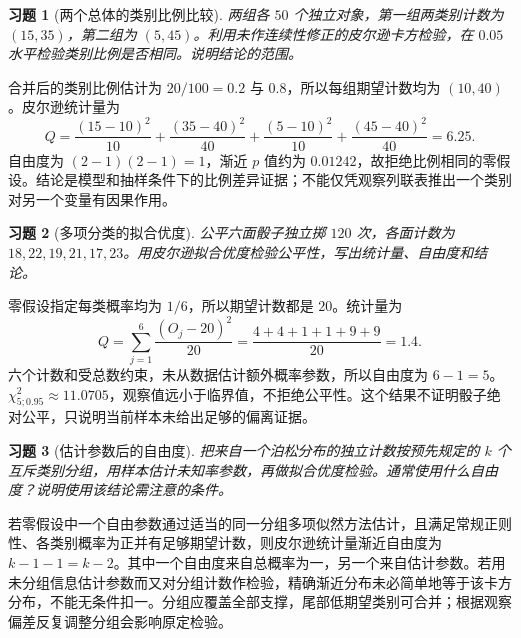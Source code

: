 \documentclass[12pt,fontset=fandol]{ctexart}
\newtheorem{exercise}{习题}[section]
\begin{document}
\begin{exercise}[两个总体的类别比例比较]\label{q:M-E2-II5}
两组各 $50$ 个独立对象，第一组两类别计数为 $(15,35)$，第二组为 $(5,45)$。利用未作连续性修正的皮尔逊卡方检验，在 $0.05$ 水平检验类别比例是否相同。说明结论的范围。\par{}
\end{exercise}

\begin{solve}\label{a:M-E2-II5}合并后的类别比例估计为 $20/100=0.2$ 与 $0.8$，所以每组期望计数均为 $(10,40)$。皮尔逊统计量为\[Q=\frac{(15-10)^2}{10}+\frac{(35-40)^2}{40}+\frac{(5-10)^2}{10}+\frac{(45-40)^2}{40}=6.25.\]自由度为 $(2-1)(2-1)=1$，渐近 $p$ 值约为 $0.01242$，故拒绝比例相同的零假设。结论是模型和抽样条件下的比例差异证据；不能仅凭观察列联表推出一个类别对另一个变量有因果作用。\end{solve}

\begin{exercise}[多项分类的拟合优度]\label{q:B15.1}
公平六面骰子独立掷 $120$ 次，各面计数为 $18,22,19,21,17,23$。用皮尔逊拟合优度检验公平性，写出统计量、自由度和结论。\par{}
\end{exercise}

\begin{solve}\label{a:B15.1}零假设指定每类概率均为 $1/6$，所以期望计数都是 $20$。统计量为\[Q=\sum_{j=1}^6\frac{(O_j-20)^2}{20}=\frac{4+4+1+1+9+9}{20}=1.4.\]六个计数和受总数约束，未从数据估计额外概率参数，所以自由度为 $6-1=5$。$\chi^2_{5;0.95}\approx11.0705$，观察值远小于临界值，不拒绝公平性。这个结果不证明骰子绝对公平，只说明当前样本未给出足够的偏离证据。\end{solve}

\begin{exercise}[估计参数后的自由度]\label{q:B15.2}
把来自一个泊松分布的独立计数按预先规定的 $k$ 个互斥类别分组，用样本估计未知率参数，再做拟合优度检验。通常使用什么自由度？说明使用该结论需注意的条件。\par{}
\end{exercise}

\begin{solve}\label{a:B15.2}若零假设中一个自由参数通过适当的同一分组多项似然方法估计，且满足常规正则性、各类别概率为正并有足够期望计数，则皮尔逊统计量渐近自由度为 $k-1-1=k-2$。其中一个自由度来自总概率为一，另一个来自估计参数。若用未分组信息估计参数而又对分组计数作检验，精确渐近分布未必简单地等于该卡方分布，不能无条件扣一。分组应覆盖全部支撑，尾部低期望类别可合并；根据观察偏差反复调整分组会影响原定检验。\end{solve}
\end{document}
